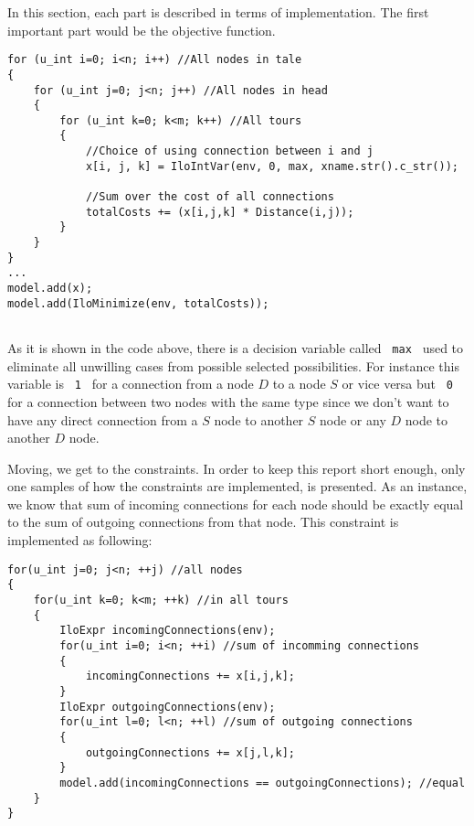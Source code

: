 In this section, each part is described in terms of implementation. The first
important part would be the objective function.

\begin{lstlisting}
for (u_int i=0; i<n; i++) //All nodes in tale
{
    for (u_int j=0; j<n; j++) //All nodes in head
    {
    	for (u_int k=0; k<m; k++) //All tours
        {
            //Choice of using connection between i and j
            x[i, j, k] = IloIntVar(env, 0, max, xname.str().c_str());
            
            //Sum over the cost of all connections
            totalCosts += (x[i,j,k] * Distance(i,j));
        }
    }
}
...
model.add(x);
model.add(IloMinimize(env, totalCosts));
     
\end{lstlisting}

As it is shown in the code above, there is a decision variable called
\texttt{ max } used to eliminate all unwilling cases from possible selected
possibilities. For instance this variable is \texttt{ 1 } for a connection from
a node $D$ to a node $S$ or vice versa but \texttt{ 0 } for a connection between
two nodes with the same type since we don't want to have any direct connection
from a $S$ node to another $S$ node or any $D$ node to another $D$ node.

Moving, we get to the constraints. In order to keep this report short enough,
only one samples of how the constraints are implemented, is presented. As an instance, we know that sum of incoming connections for
each node should be exactly equal to the sum of outgoing connections from that
node. This constraint is implemented as following:

\begin{lstlisting}
for(u_int j=0; j<n; ++j) //all nodes
{
    for(u_int k=0; k<m; ++k) //in all tours 
    {
        IloExpr incomingConnections(env);
        for(u_int i=0; i<n; ++i) //sum of incomming connections
        {
            incomingConnections += x[i,j,k];
        }
        IloExpr outgoingConnections(env);
        for(u_int l=0; l<n; ++l) //sum of outgoing connections
        {
            outgoingConnections += x[j,l,k];
        }
        model.add(incomingConnections == outgoingConnections); //equal
    }
}
\end{lstlisting}
